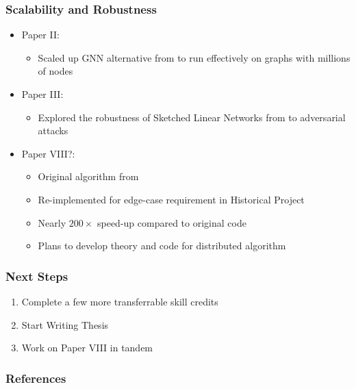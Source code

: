 \documentclass[pdf]{beamer}
\begin{document}
\begin{frame}
    \frametitle{Scalability and Robustness}
    \begin{itemize}
        \item Paper II: \citet{merchant2022JANE}
        \begin{itemize}
            \item Scaled up GNN alternative from \citet{merchant2022JANEorig} to run effectively on graphs with millions of nodes
        \end{itemize}
        \item Paper III: \citet{10.1145/3511808.3557687}
        \begin{itemize}
            \item Explored the robustness of Sketched Linear Networks from \citet{tai2018sketch} to adversarial attacks
        \end{itemize}
        \item Paper VIII?: 
        \begin{itemize}
            \item Original algorithm from \citet{wang2023fmmd}
            \item Re-implemented for edge-case requirement in Historical Project
            \item Nearly $200\times$ speed-up compared to original code
            \item Plans to develop theory and code for distributed algorithm 
        \end{itemize}
    \end{itemize}
\end{frame}

\begin{frame}
    \frametitle{Next Steps}
    \begin{enumerate}
        \item Complete a few more transferrable skill credits
        \item Start Writing Thesis
        \item Work on Paper VIII in tandem 
    \end{enumerate}
    

\end{frame}

\begin{frame}[allowframebreaks]
    \frametitle{References}
    
    
  \end{frame}
\end{document}
